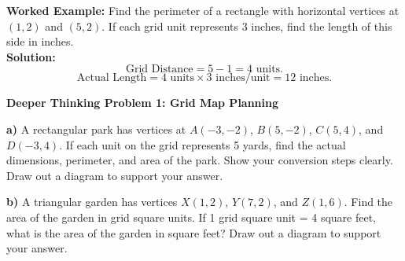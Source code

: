 \documentclass[12pt, letterpaper, fleqn]{article}
\begin{document}
\vspace{1mm}

\begin{tcolorbox}[colback=white, colframe=black!25, boxrule=0.6pt, arc=4mm, left=6mm, right=6mm, top=4mm, bottom=4mm]
\textbf{Worked Example:}
Find the perimeter of a rectangle with horizontal vertices at $(1, 2)$ and $(5, 2)$. If each grid unit represents 3 inches, find the length of this side in inches.\\
\textbf{Solution:}
$$\text{Grid Distance} = 5 - 1 = 4\text{ units.}$$
$$\text{Actual Length} = 4\text{ units} \times 3\text{ inches/unit} = 12\text{ inches.}$$
\end{tcolorbox}

\newpage

\begin{tcolorbox}[colback=white, colframe=black, boxrule=1pt, arc=4mm, left=6mm, right=6mm, top=5mm, bottom=5mm]
\textbf{Deeper Thinking Problem 1: Grid Map Planning}

\medskip
\noindent
\textbf{a)} A rectangular park has vertices at $A(-3, -2)$, $B(5, -2)$, $C(5, 4)$, and $D(-3, 4)$. If each unit on the grid represents 5 yards, find the actual dimensions, perimeter, and area of the park. Show your conversion steps clearly. Draw out a diagram to support your answer.
\vspace{8cm}

\noindent
\textbf{b)} A triangular garden has vertices $X(1, 2)$, $Y(7, 2)$, and $Z(1, 6)$. Find the area of the garden in grid square units. If 1 grid square unit = 4 square feet, what is the area of the garden in square feet? Draw out a diagram to support your answer.
\vspace{8cm}
\end{tcolorbox}

\vspace{4mm}
\end{document}
